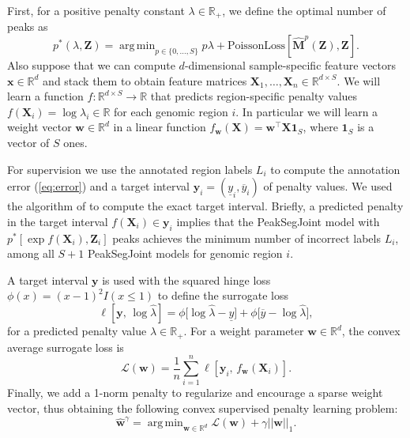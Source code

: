 \documentclass{article} %
\DeclareMathOperator*{\argmin}{arg\,min}
\newcommand{\RR}{\mathbb R}
\begin{document}
First, for a positive penalty constant $\lambda\in\RR_+$, we define
the optimal number of peaks as
\begin{equation}
  \label{eq:optimal_segments}
  p^*(\lambda, \mathbf Z) =
  \argmin_{p\in\{0, \dots, S\}}
  p \lambda + 
  \text{PoissonLoss}\left[
    \mathbf{\hat M}^p(\mathbf Z),
    \mathbf Z
  \right].
\end{equation}
Also suppose that we can compute $d$-dimensional sample-specific
feature vectors $\mathbf x\in\RR^d$ and stack them to obtain feature
matrices $\mathbf X_1,\dots, \mathbf X_n\in\RR^{d\times S}$. We will
learn a function $f:\RR^{d\times S}\rightarrow\RR$ that predicts
region-specific penalty values $f(\mathbf X_i) = \log \lambda_i\in\RR$
for each genomic region $i$. In particular we will learn a weight
vector $\mathbf w\in\RR^d$ in a linear function $f_{\mathbf w}(\mathbf X) =
\mathbf w^\intercal \mathbf X \mathbf 1_S$, where $\mathbf 1_S$ is a
vector of $S$ ones.

For supervision we use the annotated region labels $L_i$ to compute
the annotation error (\ref{eq:error}) and a target interval $\mathbf
y_i = (
    \underline y_i, \overline y_i
)$ of penalty values. We used the algorithm of
\citet{HOCKING-penalties} to compute the exact target interval.
Briefly,
a predicted penalty in the target interval $f(\mathbf
X_i)\in\mathbf y_i$ implies that the
PeakSegJoint model with $p^*\left[\exp f(\mathbf X_i), \mathbf
  Z_i\right]$ peaks achieves the minimum number of incorrect labels
$L_i$, among all $S+1$ PeakSegJoint models for genomic region $i$.

A target interval $\mathbf y$ is used with the squared hinge loss
$\phi(x)=(x-1)^2 I(x\leq 1)$ to define the surrogate loss
\begin{equation}
  \label{eq:surrogate_loss}
  \ell\left[
    \mathbf y,\,
    \log \hat \lambda
    \right]
    =
    \phi\big[
      \log\hat\lambda - \underline y
    \big]
    +
    \phi\big[
    \overline y - \log\hat\lambda
    \big],
\end{equation}
for a predicted penalty value $\hat \lambda\in\RR_+$. For a weight parameter
$\mathbf w\in\RR^d$, the convex average surrogate loss is
\begin{equation}
  \label{eq:average_surrogate}
  \mathcal L(\mathbf w) =
  \frac 1 n
  \sum_{i=1}^n
  \ell\left[
    \mathbf y_i,\,
     f_{\mathbf w}( \mathbf X_i )
    \right].
\end{equation}
Finally, we add a 1-norm penalty to regularize and encourage a sparse
weight vector, thus obtaining the following convex supervised penalty
learning problem:
\begin{equation}
  \label{argmin_w}
  \mathbf{\hat w}^\gamma = 
  \argmin_{\mathbf w\in\RR^d}
  \mathcal L(\mathbf w) + \gamma ||\mathbf w||_1.
\end{equation}
\end{document}
